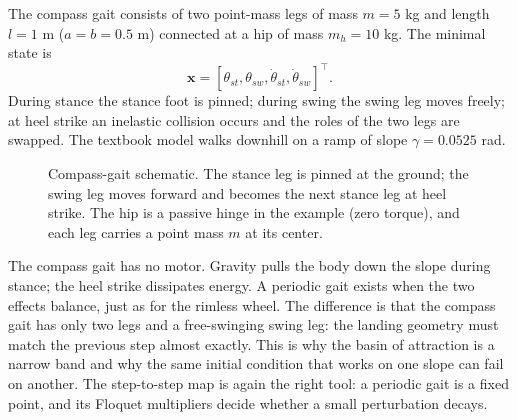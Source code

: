 \documentclass[11pt]{article}
\newcommand{\bx}{\mathbf{x}}
\begin{document}
The compass gait consists of two point-mass legs of mass $m=5$ kg and length
$l=1$ m ($a=b=0.5$ m) connected at a hip of mass $m_h=10$ kg.  The minimal
state is
\begin{equation}
\bx=[\theta_{st},\theta_{sw},\dot\theta_{st},\dot\theta_{sw}]^\top .
\end{equation}
During stance the stance foot is pinned; during swing the swing leg moves
freely; at heel strike an inelastic collision occurs and the roles of the two
legs are swapped.  The textbook model walks downhill on a ramp of slope
$\gamma=0.0525$ rad.

\begin{figure}[htbp]
\centering
{}
\caption{Compass-gait schematic.  The stance leg is pinned at the ground;
the swing leg moves forward and becomes the next stance leg at heel strike.
The hip is a passive hinge in the example (zero torque), and each leg carries
a point mass $m$ at its center.}
\label{fig:compass_gait}
\end{figure}

\begin{intuition}[breakable=false,title={Why passive walking is possible, and why it is fragile}]
The compass gait has no motor.  Gravity pulls the body down the slope during
stance; the heel strike dissipates energy.  A periodic gait exists when the
two effects balance, just as for the rimless wheel.  The difference is that
the compass gait has only two legs and a free-swinging swing leg: the landing
geometry must match the previous step almost exactly.  This is why the basin
of attraction is a narrow band and why the same initial condition that works
on one slope can fail on another.  The step-to-step map is again the right
tool: a periodic gait is a fixed point, and its Floquet multipliers decide
whether a small perturbation decays.
\end{intuition}
\end{document}
